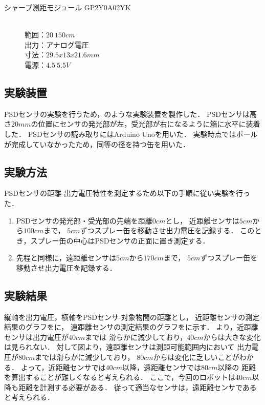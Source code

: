 \documentclass[11pt,a4]{jsarticle}
\begin{document}
  \begin{description}
    \item[シャープ測距モジュール GP2Y0A02YK] \mbox{} \\
      範囲：$20~150\unit{cm}$ \\
      出力：アナログ電圧 \\
      寸法：$29.5x13x21.6\unit{mm}$ \\
      電源：$4.5~5.5\unit{V}$
  \end{description}

  \subsection{実験装置}
    PSDセンサの実験を行うため，のような実験装置を製作した．
    PSDセンサは高さ$20\unit{mm}$の位置にセンサの発光部が左，受光部が右になるように箱に水平に装着した．
    PSDセンサの読み取りにはArduino Unoを用いた．
    実験時点ではポールが完成していなかったため，同等の径を持つ缶を用いた．


  \subsection{実験方法}
    PSDセンサの距離-出力電圧特性を測定するため以下の手順に従い実験を行った．
    \begin{enumerate}
      \item PSDセンサの発光部・受光部の先端を距離$0\unit{cm}$とし，
            近距離センサは$5\unit{cm}$から$100\unit{cm}$まで，
            $5\unit{cm}$ずつスプレー缶を移動させ出力電圧を記録する．
            このとき，スプレー缶の中心はPSDセンサの正面に置き測定する．
      \item 先程と同様に，遠距離センサは$5\unit{cm}$から$170\unit{cm}$まで，
            $5\unit{cm}$ずつスプレー缶を移動させ出力電圧を記録する．
    \end{enumerate}

  \subsection{実験結果}
    縦軸を出力電圧，横軸をPSDセンサ-対象物間の距離とし，
    近距離センサの測定結果のグラフをに，
    遠距離センサの測定結果のグラフをに示す．
    より，近距離センサは出力電圧が$40\unit{cm}$までは
    滑らかに減少しており，$40\unit{cm}$からは大きな変化は見られない．
    対して図より，遠距離センサは測距可能範囲内において
    出力電圧が$80\unit{cm}$までは滑らかに減少しており，
    $80\unit{cm}$からは変化に乏しいことがわかる．
    よって，近距離センサでは$40\unit{cm}$以降，遠距離センサでは$80\unit{cm}$以降の
    距離を算出することが難しくなると考えられる．
    ここで，今回のロボットは$40\unit{cm}$以降も距離を計測する必要がある．
    従って適当なセンサは，遠距離センサであると考えられる．
\end{document}
